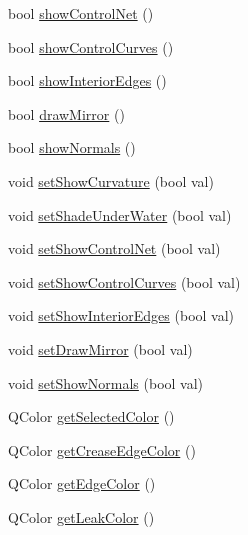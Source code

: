 \begin{DoxyCompactItemize}
\item 
bool \hyperlink{classShipCAD_1_1SubdivisionSurface_a1886c21030a3c5c85797603d2d00c906}{show\-Control\-Net} ()
\item 
bool \hyperlink{classShipCAD_1_1SubdivisionSurface_ac94824bf3a085f9785bc49e659077156}{show\-Control\-Curves} ()
\item 
bool \hyperlink{classShipCAD_1_1SubdivisionSurface_a84834b65650ff350e993c00dccabab46}{show\-Interior\-Edges} ()
\item 
bool \hyperlink{classShipCAD_1_1SubdivisionSurface_a94d284672cca1fb619ef5c064bcd175b}{draw\-Mirror} ()
\item 
bool \hyperlink{classShipCAD_1_1SubdivisionSurface_a57a2abe37fef2cee7ca6c15ae5173672}{show\-Normals} ()
\item 
void \hyperlink{classShipCAD_1_1SubdivisionSurface_abf6fe62614aadf1cdd4f26fb4d3fc441}{set\-Show\-Curvature} (bool val)
\item 
void \hyperlink{classShipCAD_1_1SubdivisionSurface_a797d9b728f794b7f2fc61f1c51dacc06}{set\-Shade\-Under\-Water} (bool val)
\item 
void \hyperlink{classShipCAD_1_1SubdivisionSurface_af5380f1a7932b23a5fbf400c85542381}{set\-Show\-Control\-Net} (bool val)
\item 
void \hyperlink{classShipCAD_1_1SubdivisionSurface_aabf54bc152176697a82c0eb6e47f5981}{set\-Show\-Control\-Curves} (bool val)
\item 
void \hyperlink{classShipCAD_1_1SubdivisionSurface_a5a4e5acd1bfc4d845d28513dd2dbc0cd}{set\-Show\-Interior\-Edges} (bool val)
\item 
void \hyperlink{classShipCAD_1_1SubdivisionSurface_a3605a409a102a18714e9ad7d028e7f33}{set\-Draw\-Mirror} (bool val)
\item 
void \hyperlink{classShipCAD_1_1SubdivisionSurface_a678530145785bd366316b35d2bd0ab67}{set\-Show\-Normals} (bool val)
\item 
Q\-Color \hyperlink{classShipCAD_1_1SubdivisionSurface_a4d307277e2a96d86b3d3e7788c2aac0a}{get\-Selected\-Color} ()
\item 
Q\-Color \hyperlink{classShipCAD_1_1SubdivisionSurface_a50b5868db7d2c5d6cce75fa2b52be60f}{get\-Crease\-Edge\-Color} ()
\item 
Q\-Color \hyperlink{classShipCAD_1_1SubdivisionSurface_a40dd77bdff5cf86b4a6eca7ff5a2e643}{get\-Edge\-Color} ()
\item 
Q\-Color \hyperlink{classShipCAD_1_1SubdivisionSurface_ac3131c3badeb6b11cb8a5ec5ceef0961}{get\-Leak\-Color} ()
\item 

\end{DoxyCompactItemize}
